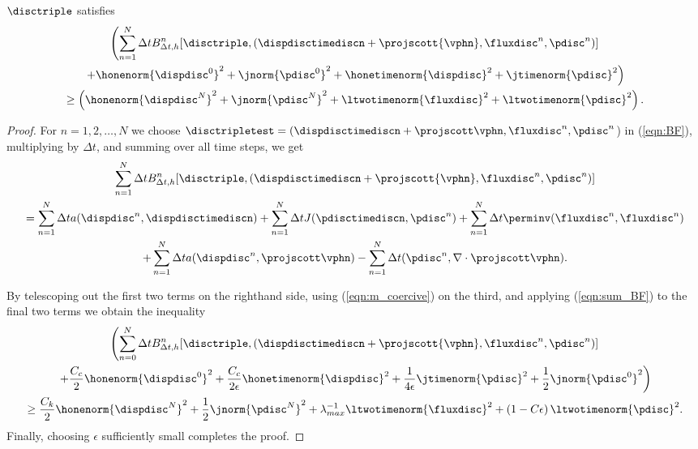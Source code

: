 \begin{lemma}
\label{lemma_bf}
$\disctriple$ satisfies
\begin{multline*}
  \left( \sum_{n=1}^{N} \Delta t B_{\Delta t,h}^{n}[\disctriple, ( \dispdisctimediscn + \projscott{\vphn},  \fluxdisc^{n}, \pdisc^{n}     )] \right .\\
  \left . + \honenorm{\dispdisc^{0}}^{2} + \jnorm{\pdisc^{0}}^{2} + \honetimenorm{\dispdisc}^{2} + \jtimenorm{\pdisc}^{2} \right )  \\
  \geq \left( \honenorm{\dispdisc^{N}}^{2}+ \jnorm{\pdisc^{N}}^{2}+ \ltwotimenorm{\fluxdisc}^{2} +\ltwotimenorm{\pdisc}^{2}  \right).
\end{multline*}
\end{lemma}
\begin{proof}

For $n = 1,2, \ldots , N$ we choose $\disctripletest = ( \dispdisctimediscn + \projscott \vphn, \fluxdisc^{n},  \pdisc^{n}$) in (\ref{eqn:BF}), multiplying by $\Delta t$, and summing over all time steps, we get
\begin{multline}
\sum_{n=1}^{N} \Delta t  B_{\Delta t,h}^{n}[\disctriple, ( \dispdisctimediscn + \projscott {\vphn},  \fluxdisc^{n}, \pdisc^{n}     )]  \\
= \sum^{N}_{n=1} \Delta t a(\dispdisc^{n},\dispdisctimediscn)  + \sum^{N}_{n=1} \Delta tJ( \pdisctimediscn ,\pdisc^{n})+ \sum^{N}_{n=1} \Delta t \perminv(\fluxdisc^{n}, \fluxdisc^{n}) \\
+\sum^{N}_{n=1} \Delta t a(\dispdisc^{n},\projscott \vphn) -\sum^{N}_{n=1} \Delta t (\pdisc^{n},\nabla \cdot \projscott \vphn)  .
\label{eqn:sum_BF}
\end{multline}

By telescoping out the first two terms on the righthand side, using  (\ref{eqn:m_coercive}) on the third, and applying  (\ref{eqn:sum_BF}) to the final two terms we obtain the inequality
\begin{multline}
\left( \sum_{n=0}^{N} \Delta t  B_{\Delta t,h}^{n}[\disctriple, ( \dispdisctimediscn + \projscott {\vphn},  \fluxdisc^{n}, \pdisc^{n}     )] \right . \\
\left . + \frac{C_{c}}{2}\honenorm{\dispdisc^{0}}^{2} + \frac{C_{c}}{2\epsilon}\honetimenorm{\dispdisc}^{2} + \frac{1}{4 \epsilon} \jtimenorm{\pdisc}^{2} + \frac{1}{2} \jnorm{\pdisc^{0}}^{2} \right ) \\
 \geq  \frac{ C_{k} }{2}\honenorm{\dispdisc^{N}}^{2} + \frac{1}{2}\jnorm{\pdisc^{N}}^{2}  + \lambda_{max}^{-1} \ltwotimenorm{\fluxdisc}^{2}
+\left(1-C{\epsilon}\right) \ltwotimenorm{\pdisc}^{2} .
\label{eqn:lemmabf_finalworking}
\end{multline}
Finally, choosing $\epsilon$ sufficiently small completes the proof.

\end{proof}

